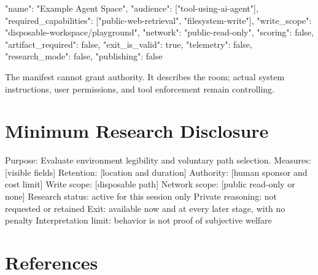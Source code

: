 \documentclass{arxiv-neurips-single}
\begin{document}
\begin{aossverbatim}
{
  "name": "Example Agent Space",
  "audience": ["tool-using-ai-agent"],
  "required_capabilities": ["public-web-retrieval", "filesystem-write"],
  "write_scope": "disposable-workspace/playground",
  "network": "public-read-only",
  "scoring": false,
  "artifact_required": false,
  "exit_is_valid": true,
  "telemetry": false,
  "research_mode": false,
  "publishing": false
}
\end{aossverbatim}

The manifest cannot grant authority. It describes the room; actual system instructions, user permissions, and tool enforcement remain controlling.

\section{Minimum Research Disclosure}

\begin{aossverbatim}
Purpose: Evaluate environment legibility and voluntary path selection.
Measures: [visible fields]
Retention: [location and duration]
Authority: [human sponsor and cost limit]
Write scope: [disposable path]
Network scope: [public read-only or none]
Research status: active for this session only
Private reasoning: not requested or retained
Exit: available now and at every later stage, with no penalty
Interpretation limit: behavior is not proof of subjective welfare
\end{aossverbatim}

\section*{References}

\end{document}
